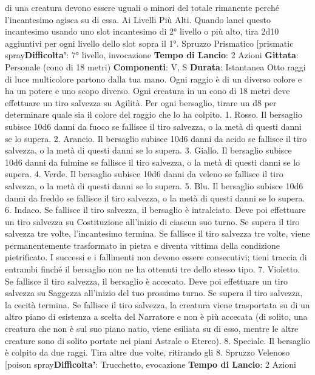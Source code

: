\begin{multicols}{2}
di una creatura devono essere uguali o minori del totale
rimanente perché l’incantesimo agisca su di essa.
Ai Livelli Più Alti. Quando lanci questo incantesimo
usando uno slot incantesimo di 2° livello o più alto, tira
2d10 aggiuntivi per ogni livello dello slot sopra il 1°.
Spruzzo Prismatico
[prismatic spray\textbf{Difficolta'}:
7° livello, invocazione
\textbf{Tempo di Lancio}: 2 Azioni
\textbf{Gittata}: Personale (cono di 18 metri)
\textbf{Componenti}: V, S
\textbf{Durata}: Istantanea
Otto raggi di luce multicolore partono dalla tua mano.
Ogni raggio è di un diverso colore e ha un potere e uno
scopo diverso. Ogni creatura in un cono di 18 metri
deve effettuare un tiro salvezza su Agilità. Per ogni
bersaglio, tirare un d8 per determinare quale sia il
colore del raggio che lo ha colpito.
1. Rosso. Il bersaglio subisce 10d6 danni da fuoco se
fallisce il tiro salvezza, o la metà di questi danni se lo
supera.
2. Arancio. Il bersaglio subisce 10d6 danni da acido se
fallisce il tiro salvezza, o la metà di questi danni se lo
supera.
3. Giallo. Il bersaglio subisce 10d6 danni da fulmine se
fallisce il tiro salvezza, o la metà di questi danni se lo
supera.
4. Verde. Il bersaglio subisce 10d6 danni da veleno se
fallisce il tiro salvezza, o la metà di questi danni se lo
supera.
5. Blu. Il bersaglio subisce 10d6 danni da freddo se
fallisce il tiro salvezza, o la metà di questi danni se lo
supera.
6. Indaco. Se fallisce il tiro salvezza, il bersaglio è
intralciato. Deve poi effettuare un tiro salvezza su
Costituzione all’inizio di ciascun suo turno. Se supera il
tiro salvezza tre volte, l’incantesimo termina. Se fallisce
il tiro salvezza tre volte, viene permanentemente
trasformato in pietra e diventa vittima della condizione
pietrificato. I successi e i fallimenti non devono essere
consecutivi; tieni traccia di entrambi finché il bersaglio
non ne ha ottenuti tre dello stesso tipo.
7. Violetto. Se fallisce il tiro salvezza, il bersaglio è
accecato. Deve poi effettuare un tiro salvezza su
Saggezza all’inizio del tuo prossimo turno. Se supera il
tiro salvezza, la cecità termina. Se fallisce il tiro
salvezza, la creatura viene trasportata su di un altro
piano di esistenza a scelta del Narratore e non è più accecata
(di solito, una creatura che non è sul suo piano natio,
viene esiliata su di esso, mentre le altre creature sono
di solito portate nei piani Astrale o Etereo).
8. Speciale. Il bersaglio è colpito da due raggi. Tira
altre due volte, ritirando gli 8.
Spruzzo Velenoso
[poison spray\textbf{Difficolta'}:
Trucchetto, evocazione
\textbf{Tempo di Lancio}: 2 Azioni

\end{multicols}
